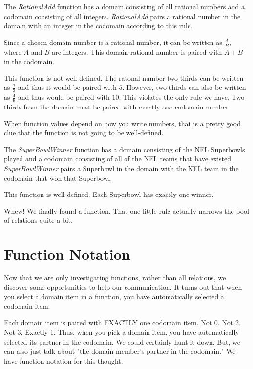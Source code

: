 \documentclass{ximera}
\begin{document}
\begin{example}
The \textit{RationalAdd} function has a domain consisting of all rational numbers and a codomain consisting of all integers.  \textit{RationalAdd} pairs a rational number in the domain with an integer in the codomain according to this rule.

Since a chosen domain number is a rational number, it can be written as $\tfrac{A}{B}$, where $A$ and $B$ are integers. This domain rational number is paired with $A+B$ in the codomain.

This function is not well-defined.  The ratonal number two-thirds can be written as $\tfrac{2}{3}$ and thus it would be paired with $5$.  However, two-thirds can also be written as $\tfrac{4}{6}$ and thus would be paired with $10$.  This violates the only rule we have.  Two-thirds from the domain must be paired with exactly one codomain number.

When function values depend on how you write numbers, that is a pretty good clue that the function is not going to be well-defined.
\end{example}



\begin{example}
The \textit{SuperBowlWinner} function has a domain consisting of the NFL Superbowls played and a codomain consisting of all of the NFL teams that have existed.  \textit{SuperBowlWinner} pairs a Superbowl in the domain with the NFL team in the codomain that won that Superbowl. 

This function is well-defined. Each Superbowl has exactly one winner.
\end{example}


Whew!  We finally found a function. That one little rule actually narrows the pool of relations quite a bit.



\section{Function Notation}

Now that we are only investigating functions, rather than all relations, we discover some opportunities to help our communication.  It turns out that when you select a domain item in a function, you have automatically selected a codomain item.

Each domain item is paired with EXACTLY one codomain item.  Not 0. Not 2.  Not 3.  Exactly 1.  Thus, when you pick a domain item, you have automatically selected its partner in the codomain.  We could certainly hunt it down.  But, we can also just talk about "the domain member's partner in the codomain."  We have function notation for this thought.
\end{document}
